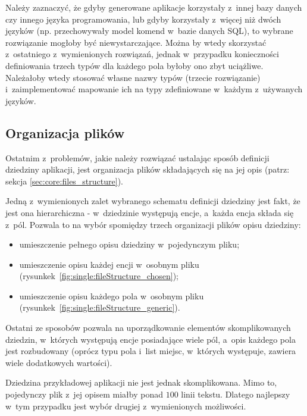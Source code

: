 Należy zaznaczyć, że gdyby generowane aplikacje korzystały z~innej bazy danych czy innego języka programowania, lub gdyby korzystały z~więcej niż dwóch języków (np. przechowywały model komend w~bazie danych SQL), to wybrane rozwiązanie mogłoby być niewystarczające.
Można by wtedy skorzystać z~ostatniego z~wymienionych rozwiązań, jednak w~przypadku konieczności definiowania trzech typów dla każdego pola byłoby ono zbyt uciążliwe.
Należałoby wtedy stosować własne nazwy typów (trzecie rozwiązanie) i~zaimplementować mapowanie ich na typy zdefiniowane w~każdym z~używanych języków.


\subsection{Organizacja plików}

Ostatnim z~problemów, jakie należy rozwiązać ustalając sposób definicji dziedziny aplikacji, jest organizacja plików składających się na jej opis (patrz: sekcja \ref{sec:core:files_structure}).

Jedną z~wymienionych zalet wybranego schematu definicji dziedziny jest fakt, że jest ona hierarchiczna - w~dziedzinie występują encje, a~każda encja składa się z~pól.
Pozwala to na wybór spomiędzy trzech organizacji plików opisu dziedziny:

\begin{itemize}
 \item umieszczenie pełnego opisu dziedziny w~pojedynczym pliku;
 \item umieszczenie opisu każdej encji w~osobnym pliku (rysunkek~\ref{fig:single:fileStructure_chosen});
 \item umieszczenie opisu każdego pola w~osobnym pliku (rysunkek~\ref{fig:single:fileStructure_generic}).
\end{itemize}




Ostatni ze sposobów pozwala na uporządkowanie elementów skomplikowanych dziedzin, w~których występują encje posiadające wiele pól, a~opis każdego pola jest rozbudowany (oprócz typu pola i~list miejsc, w~których występuje, zawiera wiele dodatkowych wartości).

Dziedzina przykładowej aplikacji nie jest jednak skomplikowana.
Mimo to, pojedynczy plik z~jej opisem miałby ponad $100$ linii tekstu.
Dlatego najlepszy w~tym przypadku jest wybór drugiej z~wymienionych możliwości.



